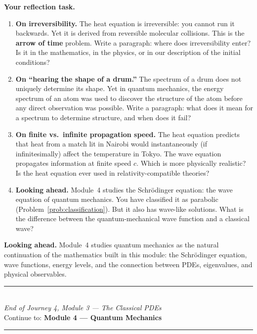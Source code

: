 \documentclass[12pt,a4paper]{article}
\newcounter{problem}
\begin{document}
\begin{reflectionbox}
\textbf{Your reflection task.}

\begin{enumerate}
  \item \textbf{On irreversibility.} The heat equation is irreversible: you cannot run it backwards. Yet it is derived from reversible molecular collisions. This is the \textbf{arrow of time} problem. Write a paragraph: where does irreversibility enter? Is it in the mathematics, in the physics, or in our description of the initial conditions?

  \item \textbf{On ``hearing the shape of a drum.''} The spectrum of a drum does not uniquely determine its shape. Yet in quantum mechanics, the energy spectrum of an atom was used to discover the structure of the atom before any direct observation was possible. Write a paragraph: what does it mean for a spectrum to determine structure, and when does it fail?

  \item \textbf{On finite vs.\ infinite propagation speed.} The heat equation predicts that heat from a match lit in Nairobi would instantaneously (if infinitesimally) affect the temperature in Tokyo. The wave equation propagates information at finite speed $c$. Which is more physically realistic? Is the heat equation ever used in relativity-compatible theories?

  \item \textbf{Looking ahead.} Module~4 studies the Schr\"{o}dinger equation: the wave equation of quantum mechanics. You have classified it as parabolic (Problem~\ref{prob:classification}). But it also has wave-like solutions. What is the difference between the quantum-mechanical wave function and a classical wave?
\end{enumerate}
\end{reflectionbox}

\medskip
\noindent\textbf{Looking ahead.}
Module~4 studies quantum mechanics as the natural continuation of the mathematics built in this module: the Schr\"{o}dinger equation, wave functions, energy levels, and the connection between PDEs, eigenvalues, and physical observables.

\vspace{1.4cm}
\begin{center}
{\color{MidBlue}\rule{0.5\linewidth}{0.8pt}}\\[6pt]
{\small\color{DarkGrey}\textit{End of Journey 4, Module 3 --- The Classical PDEs}}\\[4pt]
{\small\color{DarkGrey}Continue to: \textbf{Module 4 --- Quantum Mechanics}}\\[6pt]
{\color{MidBlue}\rule{0.5\linewidth}{0.8pt}}
\end{center}
\end{document}
